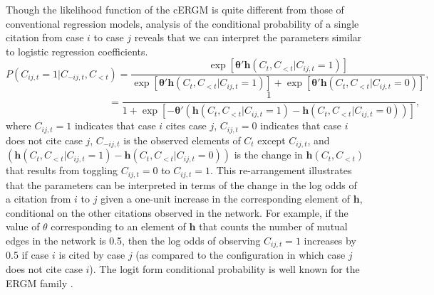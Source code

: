 \documentclass{cup-pan}
\begin{document}
Though the likelihood function of the cERGM is quite different from those of conventional regression models, analysis of the conditional probability of a single citation from case $i$ to case $j$ reveals that we can interpret the parameters similar to logistic regression coefficients. $$ P(C_{ij,t} = 1 | C_{-ij,t}, C_{ < t}) = \frac{\exp \left[ {\bm{\theta}'\bm{h}(C_{t},C_{<t}| C_{ij,t} = 1) } \right]}{ \exp \left[ {\bm{\theta}'\bm{h}(C_{t},C_{<t}| C_{ij,t} = 1) } \right] + \exp \left[ {\bm{\theta}'\bm{h}(C_{t},C_{<t}| C_{ij,t} = 0) } \right]}, $$ $$ \text{~~~~~~~~~~~~~~~~~~~~~~~~~~~~~~~} = \frac{1}{ 1 + \exp \left[ - {\bm{\theta}'\left(\bm{h}(C_{t},C_{<t}| C_{ij,t} = 1) - \bm{h}(C_{t},C_{<t}| C_{ij,t} = 0)\right)} \right]}, $$
where $C_{ij,t} = 1$ indicates that case $i$ cites case $j$, $C_{ij,t} = 0$ indicates that case $i$ does not cite case $j$, $C_{-ij,t}$ is the observed elements of $C_{t}$ except $C_{ij,t}$, and $\left(\bm{h}(C_{t},C_{<t}| C_{ij,t} = 1) - \bm{h}(C_{t},C_{<t}| C_{ij,t} = 0)\right)$ is the change in $\bm{h}(C_{t},C_{<t})$ that results from toggling $C_{ij,t} = 0$ to $C_{ij,t} = 1$. This re-arrangement illustrates that the parameters can be interpreted in terms of the change in the log odds of a citation from $i$ to $j$ given a one-unit increase in the corresponding element of $\bm{h}$, conditional on the other citations observed in the network. For example, if the value of $\theta$ corresponding to an element of $\bm{h}$ that counts the number of mutual edges in the network is 0.5, then the log odds of observing $C_{ij,t} = 1$ increases by 0.5 if case $i$ is cited by case $j$ (as compared to the configuration in which case $j$ does not cite case $i$). The logit form conditional probability is well known for the ERGM family \citep{goodreau2009birds}. 
\end{document}
